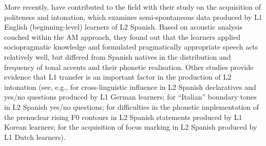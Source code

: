More recently, \citet{AstrucVanrell2016} have contributed to the field with their study on the acquisition of politeness and intonation, which examines semi-spontaneous data produced by L1 English (beginning-level) learners of L2 Spanish. Based on acoustic analysis couched within the AM approach, they found out that the learners applied sociopragmatic knowledge and formulated pragmatically appropriate speech acts relatively well, but differed from Spanish natives in the distribution and frequency of tonal accents and their phonetic realisation. Other studies provide evidence that L1 transfer is an important factor in the production of L2 intonation (see, e.g., \citealt{Radel2008} for cross-linguistic influence in L2 Spanish declaratives and yes/no questions produced by L1 German learners; \citealt{GabrielKireva2014a} for “Italian” boundary tones in L2 Spanish yes/no questions; \citealt{JunEtAl2018} for difficulties in the phonetic implementation of the prenuclear rising F0 contours in L2 Spanish statements produced by L1 Korean learners; \citealt{vanMaastricht2018} for the acquisition of focus marking in L2 Spanish produced by L1 Dutch learners).




